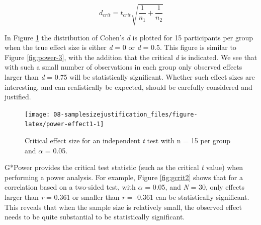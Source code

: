 \documentclass[
  oneside]{book}
\begin{document}
\[d_{crit} = t_{crit}{\sqrt{\frac{1}{n_1} + \frac{1}{n_2}}}\]

In Figure \ref{fig:power-effect1} the distribution of Cohen's \emph{d} is plotted for 15 participants per group when the true effect size is either \emph{d} = 0 or \emph{d} = 0.5. This figure is similar to Figure \ref{fig:power-3}, with the addition that the critical \emph{d} is indicated. We see that with such a small number of observations in each group only observed effects larger than \emph{d} = 0.75 will be statistically significant. Whether such effect sizes are interesting, and can realistically be expected, should be carefully considered and justified.



\begin{figure}

{\centering \texttt{[image: 08-samplesizejustification\_files/figure-latex/power-effect1-1]} 

}

\caption{Critical effect size for an independent \emph{t} test with n = 15 per group and \(\alpha\) = 0.05.}\label{fig:power-effect1}
\end{figure}

G*Power provides the critical test statistic (such as the critical \emph{t} value) when performing a power analysis. For example, Figure \ref{fig:gcrit2} shows that for a correlation based on a two-sided test, with \(\alpha\) = 0.05, and \emph{N} = 30, only effects larger than \emph{r} = 0.361 or smaller than \emph{r} = -0.361 can be statistically significant. This reveals that when the sample size is relatively small, the observed effect needs to be quite substantial to be statistically significant.
\end{document}
